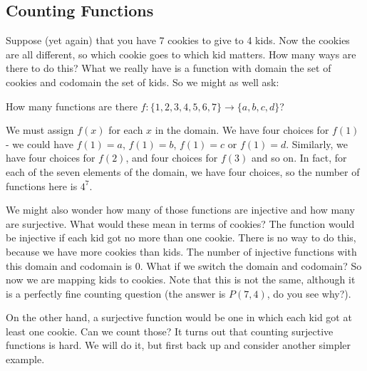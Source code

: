 \documentclass[12pt]{article}
\begin{document}
\subsection{Counting Functions}

Suppose (yet again) that you have 7 cookies to give to 4 kids.  Now the cookies are all different, so which cookie goes to which kid matters.  How many ways are there to do this?  What we really have is a function with domain the set of cookies and codomain the set of kids.  So we might as well ask:

\begin{example}
 How many functions are there $f: \{1,2,3,4,5,6,7\} \to \{a,b,c,d\}$?
 \begin{solution}
 	We must assign $f(x)$ for each $x$ in the domain.  We have four choices for $f(1)$ - we could have $f(1) = a$, $f(1) = b$, $f(1) = c$ or $f(1) = d$.  Similarly, we have four choices for $f(2)$, and four choices for $f(3)$ and so on.  In fact, for each of the seven elements of the domain, we have four choices, so the number of functions here is $4^7$.  
 \end{solution}
\end{example}

We might also wonder how many of those functions are injective and how many are surjective.  What would these mean in terms of cookies?  The function would be injective if each kid got no more than one cookie.  There is no way to do this, because we have more cookies than kids.  The number of injective functions with this domain and codomain is 0.  What if we switch the domain and codomain?  So now we are mapping kids to cookies.  Note that this is not the same, although it is a perfectly fine counting question (the answer is $P(7,4)$, do you see why?). 

On the other hand, a surjective function would be one in which each kid got at least one cookie.  Can we count those? It turns out that counting surjective functions is hard.  We will do it, but first back up and consider another simpler example.
\end{document}
